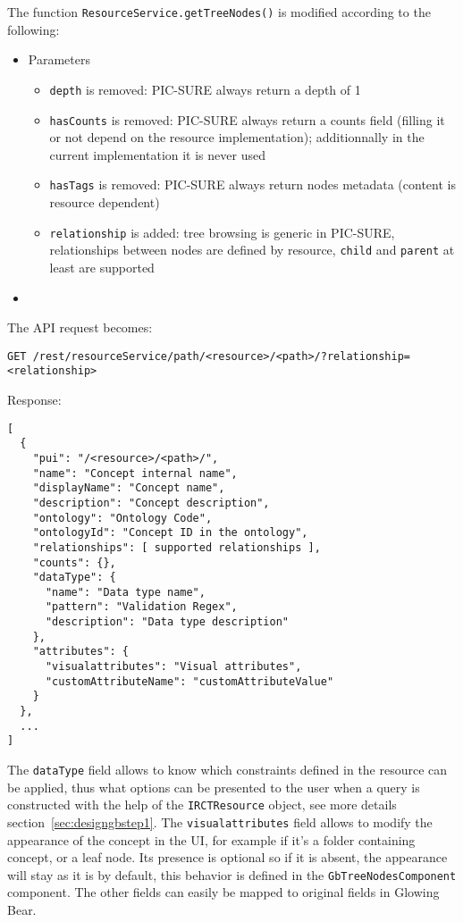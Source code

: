 The function \verb|ResourceService.getTreeNodes()| is modified according to the following:
\begin{itemize}
    \item Parameters
    \begin{itemize}
        \item \verb|depth| is removed: PIC-SURE always return a depth of 1
        \item \verb|hasCounts| is removed: PIC-SURE always return a counts field (filling it or not depend on the resource implementation); additionnally in the current implementation it is never used
        \item \verb|hasTags| is removed: PIC-SURE always return nodes metadata (content is resource dependent)
        \item \verb|relationship| is added: tree browsing is generic in PIC-SURE, relationships between nodes are defined by resource, \verb|child| and \verb|parent| at least are supported
    \end{itemize}
    \item 
\end{itemize}

The API request becomes:
\begin{verbatim}
GET /rest/resourceService/path/<resource>/<path>/?relationship=<relationship>
\end{verbatim}

Response:
\begin{verbatim}
[
  {
    "pui": "/<resource>/<path>/",
    "name": "Concept internal name",
    "displayName": "Concept name",
    "description": "Concept description",
    "ontology": "Ontology Code",
    "ontologyId": "Concept ID in the ontology",
    "relationships": [ supported relationships ],
    "counts": {},
    "dataType": {
      "name": "Data type name",
      "pattern": "Validation Regex",
      "description": "Data type description"
    },
    "attributes": {
      "visualattributes": "Visual attributes",
      "customAttributeName": "customAttributeValue"
    }
  },
  ...
]
\end{verbatim}

The \verb|dataType| field allows to know which constraints defined in the resource can be applied, thus what options can be presented to the user when a query is constructed with the help of the \verb|IRCTResource| object, see more details section~\ref{sec:designgbstep1}.
The \verb|visualattributes| field allows to modify the appearance of the concept in the UI, for example if it's a folder containing concept, or a leaf node. 
Its presence is optional so if it is absent, the appearance will stay as it is by default, this behavior is defined in the \verb|GbTreeNodesComponent| component.
The other fields can easily be mapped to original fields in Glowing Bear.

